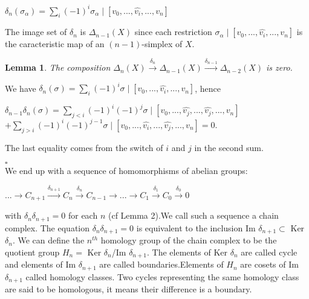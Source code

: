 \documentclass[12pt, a4paper]{article}
\newtheorem{lemma}{Lemma}
\newenvironment{proof}{{\sc Proof:}}{\hfill $\square$}
\begin{document}
\begin{center}

  $\delta_n(\sigma_\alpha) = \sum_i (-1)^i \sigma_\alpha \mid [v_0 , ... , \hat{v_i} , ... , v_n]$

\end{center}

The image set of $\delta_n$ is $\Delta_{n-1} (X)$ since each restriction $\sigma_\alpha \mid [v_0 , ... , \hat{v_i} , ... , v_n]$ is the caracteristic map of an $(n-1)$-simplex of $X$.\\

\begin{lemma}

  The composition $\Delta_n (X) \xrightarrow{\delta_n} \Delta_{n-1} (X) \xrightarrow{\delta_{n-1}} \Delta_{n-2} (X)$ is zero.

\end{lemma}

\begin{proof}

  We have $\delta_n(\sigma) = \sum_i (-1)^i \sigma \mid [v_0, ... , \hat{v_i} , ... , v_n] $, hence \\
  \vspace{-10pt}
  \begin{center}
  $\delta_{n-1}\delta_n (\sigma) = \sum\limits_{j < i} (-1)^i (-1)^j \sigma \mid [v_0, ... , \hat{v_j} , ... , \hat{v_j} , ... , v_n]$
  \sv
$+ \sum\limits_{j > i} (-1)^i (-1)^{j-1} \sigma \mid [v_0, ... , \hat{v_i}, ... , \hat{v_j} , ... , v_n] = 0$.
\end{center}

  The last equality comes from the switch of $i$ and $j$ in the second sum.

\end{proof}
\\

We end up with a sequence of homomorphisms of abelian groups:\\

\begin{center}
  $... \to C_{n+1} \xrightarrow{\delta_{n+1}} C_n \xrightarrow{\delta_n} C_{n-1} \to ... \to C_1 \xrightarrow{\delta_1} C_0 \xrightarrow{\delta_0} 0$
\end{center}

with $\delta_n\delta_{n+1} = 0$ for each $n$ (cf Lemma 2).We call such a sequence a chain complex. The equation $\delta_n \delta_{n+1} = 0$ is equivalent to the inclusion Im $\delta_{n+1} \subset$ Ker $\delta_n$. We can define the $n^{th}$ homology group of the chain complex to be the quotient group $H_n =$ Ker $\delta_n$/Im $\delta_{n+1}$. The elements of Ker $\delta_n$ are called cycle and elements of Im $\delta_{n+1}$ are called boundaries.Elements of $H_n$ are cosets of Im $\delta_{n+1}$ called homology classes. Two cycles representing the same homology class are said to be homologous, it means their difference is a boundary.\\
\end{document}
